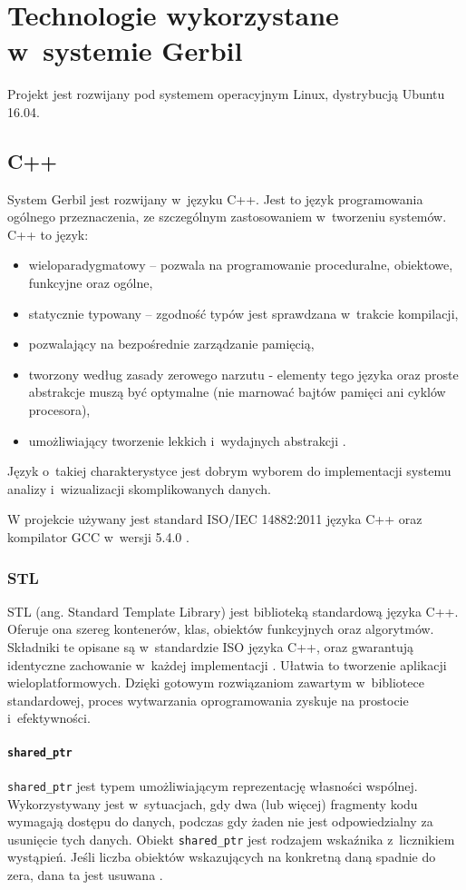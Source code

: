 \chapter{Technologie wykorzystane w~systemie Gerbil}

Projekt jest rozwijany pod systemem operacyjnym Linux, dystrybucją Ubuntu 16.04.

 \section{C++}
System Gerbil jest rozwijany w~języku C++. Jest to język programowania ogólnego przeznaczenia, ze szczególnym zastosowaniem w~tworzeniu systemów. C++ to język: 
\begin{itemize}
	\item wieloparadygmatowy -- pozwala na programowanie proceduralne, obiektowe, funkcyjne oraz ogólne,
	\item statycznie typowany -- zgodność typów jest sprawdzana w~trakcie kompilacji,
	\item pozwalający na bezpośrednie zarządzanie pamięcią,
	\item tworzony według zasady zerowego narzutu - elementy tego języka oraz proste abstrakcje muszą być optymalne (nie marnować bajtów pamięci ani cyklów procesora),
	\item umożliwiający tworzenie lekkich i~wydajnych abstrakcji \cite{Stroustrup}\cite{cplusplus}.
\end{itemize}

Język o~takiej charakterystyce jest dobrym wyborem do implementacji systemu analizy i~wizualizacji skomplikowanych danych.

W projekcie używany jest standard ISO/IEC 14882:2011 języka C++ oraz kompilator GCC w~wersji 5.4.0 \cite{C++11}.

 \subsection{STL}
STL (ang. Standard Template Library) jest biblioteką standardową języka C++. Oferuje ona szereg kontenerów, klas, obiektów funkcyjnych oraz algorytmów. Składniki te opisane są w~standardzie ISO języka C++, oraz gwarantują identyczne zachowanie w~każdej implementacji \cite{Stroustrup}. Ułatwia to tworzenie aplikacji wieloplatformowych. Dzięki gotowym rozwiązaniom zawartym w~bibliotece standardowej, proces wytwarzania oprogramowania zyskuje na prostocie i~efektywności. 

 \subsubsection{\lstinline$shared_ptr$}
\lstinline$shared_ptr$ jest typem umożliwiającym reprezentację własności wspólnej. Wykorzystywany jest w~sytuacjach, gdy dwa (lub więcej) fragmenty kodu wymagają dostępu do danych, podczas gdy żaden nie jest odpowiedzialny za usunięcie tych danych. Obiekt \lstinline$shared_ptr$ jest rodzajem wskaźnika z~licznikiem wystąpień. Jeśli liczba obiektów wskazujących na konkretną daną spadnie do zera, dana ta jest usuwana \cite{Stroustrup}. 

